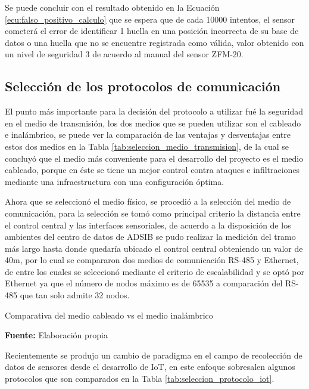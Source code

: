 \documentclass[../principal]{subfiles}
\begin{document}
  Se puede concluir con el resultado obtenido en la Ecuación \ref{ecu:falso_positivo_calculo} que se espera que de cada 10000 intentos, el sensor cometerá el error de identificar 1 huella en una posición incorrecta de su base de datos o una huella que no se encuentre registrada como válida, valor obtenido con un nivel de seguridad 3 de acuerdo al manual del sensor ZFM-20\cite{manual:fingerprint_ZFM-20}.

  \subsection{Selección de los protocolos de comunicación}

  El punto más importante para la decisión del protocolo a utilizar fué la seguridad en el medio de transmisión, los dos medios que se pueden utilizar son el cableado e inalámbrico, se puede ver la comparación de las ventajas y desventajas entre estos dos medios en la Tabla \ref{tab:seleccion_medio_transmision}, de la cual se concluyó que el medio más conveniente para el desarrollo del proyecto es el medio cableado, porque en éste se tiene un mejor control contra ataques e infiltraciones mediante una infraestructura con una configuración óptima.

  Ahora que se seleccionó el medio físico, se procedió a la selección del medio de comunicación, para la selección se tomó como principal criterio la distancia entre el control central y las interfaces sensoriales, de acuerdo a la disposición de los ambientes del centro de datos de ADSIB se pudo realizar la medición del tramo más largo hasta donde quedaría ubicado el control central obteniendo un valor de 40m, por lo cual se compararon dos medios de comunicación RS-485 y Ethernet, de entre los cuales se seleccionó mediante el criterio de escalabilidad y se optó por Ethernet ya que el número de nodos máximo es de 65535 a comparación del RS-485 que tan solo admite 32 nodos.

  \begin{table}[H]
    \centering
    \caption{Comparativa del medio cableado vs el medio inalámbrico}
    
    \caption*{\textbf{Fuente:} Elaboración propia}
    \label{tab:seleccion_medio_transmision}
  \end{table}

  Recientemente se produjo un cambio de paradigma en el campo de recolección de datos de sensores desde el desarrollo de IoT, en este enfoque sobresalen algunos protocolos que son comparados en la Tabla \ref{tab:seleccion_protocolo_iot}.
\end{document}
